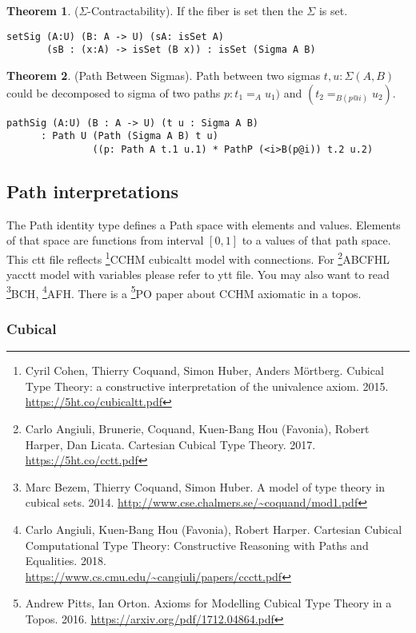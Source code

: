 \documentclass{article}
\theoremstyle{definition}
\newtheorem{theorem}{Theorem}
\begin{document}
\begin{theorem} ($\Sigma$-Contractability). If the fiber is set then the $\Sigma$ is set.
\begin{lstlisting}
setSig (A:U) (B: A -> U) (sA: isSet A)
       (sB : (x:A) -> isSet (B x)) : isSet (Sigma A B)
\end{lstlisting}
\end{theorem}

\begin{theorem} (Path Between Sigmas).
Path between two sigmas $t,u: \Sigma(A,B)$ could be decomposed to
sigma of two paths $p:t_1=_{A}u_1)$ and $(t_2=_{B(p@i)}u_2)$.
\begin{lstlisting}
pathSig (A:U) (B : A -> U) (t u : Sigma A B)
      : Path U (Path (Sigma A B) t u)
               ((p: Path A t.1 u.1) * PathP (<i>B(p@i)) t.2 u.2)
\end{lstlisting}
\end{theorem}

\subsection{Path interpretations}

The Path identity type defines a Path space with elements and values.
Elements of that space are functions from interval $[0,1]$ to a values of that path space.
This ctt file reflects \footnote{Cyril Cohen, Thierry Coquand, Simon Huber, Anders M{\"{o}}rtberg. Cubical Type Theory: a constructive interpretation of the univalence axiom. 2015. \url{https://5ht.co/cubicaltt.pdf}}{CCHM} cubicaltt model with connections.
For \footnote{Carlo Angiuli, Brunerie, Coquand, Kuen-Bang Hou (Favonia), Robert Harper, Dan Licata. Cartesian Cubical Type Theory. 2017. \url{https://5ht.co/cctt.pdf}}{ABCFHL} yacctt model with
variables please refer to ytt file. You may also want to
read \footnote{Marc Bezem, Thierry Coquand, Simon Huber. A model of type theory in cubical sets. 2014. \url{http://www.cse.chalmers.se/~coquand/mod1.pdf}}{BCH},
\footnote{Carlo Angiuli, Kuen-Bang Hou (Favonia), Robert Harper. Cartesian Cubical Computational Type Theory: Constructive Reasoning with Paths and Equalities. 2018. \\ \url{https://www.cs.cmu.edu/~cangiuli/papers/ccctt.pdf}}{AFH}.
There is a \footnote{Andrew Pitts, Ian Orton. Axioms for Modelling Cubical Type Theory in a Topos. 2016. \url{https://arxiv.org/pdf/1712.04864.pdf}}{PO} paper about CCHM axiomatic in a topos.

\subsubsection{Cubical}
\end{document}
